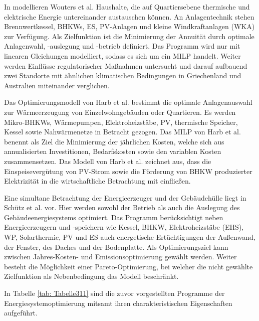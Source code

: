 In \cite{Wouters.2014} modellieren Wouters et al. Haushalte, die auf Quartiersebene thermische und elektrische Energie untereinander austauschen können.
An Anlagentechnik stehen Brennwertkessel, BHKWs, ES, PV-Anlagen und kleine Windkraftanlagen (WKA) zur Verfügung.
Als Zielfunktion ist die Minimierung der Annuität durch optimale Anlagenwahl, -auslegung und -betrieb definiert.
Das Programm wird nur mit linearen Gleichungen modelliert, sodass es sich um ein MILP handelt.
Weiter werden Einflüsse regulatorischer Maßnahmen untersucht und darauf aufbauend zwei Standorte mit ähnlichen klimatischen Bedingungen in Griechenland und Australien miteinander verglichen.

Das Optimierungsmodell von Harb et al. \cite{Harb.2016} bestimmt die optimale Anlagenauswahl zur Wärmeerzeugung von Einzelwohngebäuden oder Quartieren.
Es werden Mikro-BHKWs, Wärmepumpen, Elektroheizstäbe, PV, thermische Speicher, Kessel sowie Nahwärmenetze in Betracht gezogen.
Das MILP von Harb et al. benennt als Ziel die Minimierung der jährlichen Kosten, welche sich aus annualisierten Investitionen, Bedarfskosten sowie den variablen Kosten zusammensetzen.
Das Modell von Harb et al. zeichnet aus, dass die Einspeisevergütung von PV-Strom sowie die Förderung von BHKW produzierter Elektrizität in die wirtschaftliche Betrachtung mit einfließen.

Eine simultane Betrachtung der Energieerzeuger und der Gebäudehülle liegt in Schütz et al. \cite{Schutz.2017} vor.
Hier werden sowohl der Betrieb als auch die Auslegung des Gebäudeenergiesystems optimiert.
Das Programm berücksichtigt neben Energieerzeugern und -speichern wie Kessel, BHKW, Elektroheizstäbe (EHS), WP, Solarthermie, PV und ES auch energetische Ertüchtigungen der Außenwand, der Fenster, des Daches und der Bodenplatte.
Als Optimierungsziel kann zwischen Jahres-Kosten- und Emissionsoptimierung gewählt werden.
Weiter besteht die Möglichkeit einer Pareto-Optimierung, bei welcher die nicht gewählte Zielfunktion als Nebenbedingung das Modell beschränkt.

In Tabelle \ref{tab: Tabelle311} sind die zuvor vorgestellten Programme der Energiesystemoptimierung mitsamt ihren charakteristischen Eigenschaften aufgeführt.

